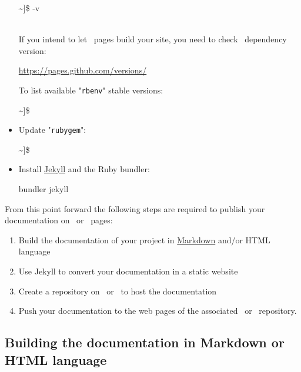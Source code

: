 \begin{itemize}
{{\begin{scripti}
\textasciitilde]\$  -v
\end{scripti}
}}
\\[-0.5cm]
\noindent If you intend to let \github\ pages build your site, you need to check \github\ dependency version:
\begin{center}\href{https://pages.github.com/versions/}{https://pages.github.com/versions/}\end{center} 
To list available "\texttt{rbenv}" stable versions:
{\footnotesize{
\begin{scripti}
\textasciitilde]\$   
\end{scripti}
}}
\item Update "\texttt{rubygem}":
{\footnotesize{
\begin{scripti}
\textasciitilde]\$   
\end{scripti}
}}
\item Install \href{https://jekyllrb.com}{Jekyll} and the Ruby bundler:
\vspace{-0.25cm}
\begin{scripti}
\fprompt{~}   bundler jekyll
\end{scripti}
\end{itemize}
From this point forward the following steps are required to publish your documentation on \github\ or \gitlab\ pages:
\begin{enumerate}
\item Build the documentation of your project in \href{https://www.markdownguide.org/}{Markdown} and/or HTML language
\item Use Jekyll to convert your documentation in a static website
\item Create a repository on \github\ or \gitlab\ to host the documentation
\item Push your documentation to the web pages of the associated \github\ or \gitlab\ repository. 
\end{enumerate}

\subsection{Building the documentation in Markdown or HTML language}

